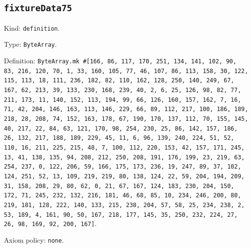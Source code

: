 \documentclass[11pt]{article}
\begin{document}
\subsection*{\texttt{fixtureData75}}
\noindent Kind: \texttt{definition}.\par
\noindent Type: \texttt{ByteArray}.\par
\noindent Definition: \texttt{ByteArray.mk \#[166, 86, 117, 170, 251, 134, 141, 102, 90, 83, 216, 120, 70, 1, 33, 160, 105, 77, 46, 107, 86, 113, 158, 30, 122, 115, 113, 18, 111, 236, 182, 82, 110, 162, 128, 250, 140, 249, 67, 167, 62, 213, 39, 133, 230, 168, 239, 40, 2, 6, 25, 126, 98, 82, 77, 211, 173, 11, 140, 152, 113, 194, 99, 66, 126, 160, 157, 162, 7, 16, 71, 42, 204, 146, 163, 113, 146, 229, 66, 89, 112, 217, 100, 186, 189, 218, 28, 208, 74, 152, 163, 178, 67, 190, 170, 137, 112, 70, 155, 145, 40, 217, 22, 84, 63, 121, 170, 98, 254, 230, 25, 86, 142, 157, 186, 26, 132, 217, 188, 189, 229, 45, 11, 6, 96, 139, 240, 224, 51, 52, 110, 16, 211, 225, 215, 48, 7, 100, 112, 220, 153, 42, 157, 171, 245, 13, 41, 138, 135, 94, 208, 212, 250, 208, 191, 176, 199, 23, 219, 63, 254, 237, 0, 122, 206, 59, 166, 175, 173, 236, 19, 247, 89, 37, 102, 124, 251, 52, 13, 109, 219, 219, 80, 138, 124, 22, 59, 204, 194, 209, 31, 158, 208, 29, 80, 62, 0, 21, 67, 167, 124, 183, 230, 204, 150, 172, 71, 245, 232, 132, 216, 181, 46, 68, 85, 10, 234, 246, 200, 80, 219, 181, 128, 222, 140, 133, 215, 238, 204, 57, 58, 25, 234, 238, 2, 53, 189, 4, 161, 90, 50, 167, 218, 177, 145, 35, 250, 232, 224, 27, 26, 98, 169, 92, 200, 167]}.\par
\noindent Axiom policy: \texttt{none}.\par
\end{document}

